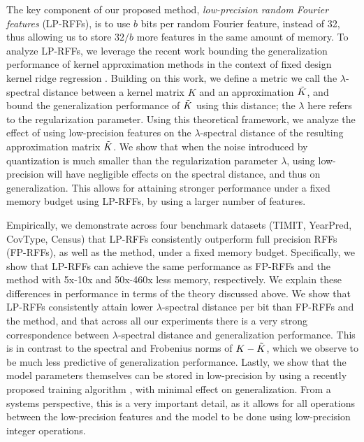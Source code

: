 
The key component of our proposed method, \textit{low-precision random Fourier features} (LP-RFFs), is to use $b$ bits per random Fourier feature, instead of 32, thus allowing us to store $32/b$ more features in the same amount of memory. To analyze LP-RFFs, we leverage the recent work bounding the generalization performance of kernel approximation methods in the context of fixed design kernel ridge regression \citep{avron17,musco17}. Building on this work, we define a metric we call the $\lambda$-spectral distance between a kernel matrix $K$ and an approximation $\tilde{K}$, and bound the generalization performance of $\tilde{K}$ using this distance; the $\lambda$ here refers to the regularization parameter. Using this theoretical framework, we analyze the effect of using low-precision features on the $\lambda$-spectral distance of the resulting approximation matrix $\tilde{K}$. We show that when the noise introduced by quantization is much smaller than the regularization parameter $\lambda$, using low-precision will have negligible effects on the spectral distance, and thus on generalization.  This allows for attaining stronger performance under a fixed memory budget using LP-RFFs, by using a larger number of features.

Empirically, we demonstrate across four benchmark datasets (TIMIT, YearPred, CovType, Census) that LP-RFFs consistently outperform full precision RFFs (FP-RFFs), as well as the \Nystrom method, under a fixed memory budget. Specifically, we show that LP-RFFs can achieve the same performance as FP-RFFs and the \Nystrom method with 5x-10x and 50x-460x less memory, respectively. We explain these differences in performance in terms of the theory discussed above. We show that LP-RFFs consistently attain lower $\lambda$-spectral distance per bit than FP-RFFs and the \Nystrom method, and that across all our experiments there is a very strong correspondence between $\lambda$-spectral distance and generalization performance. This is in contrast to the spectral and Frobenius norms of $K-\tilde{K}$, which we observe to be much less predictive of generalization performance. Lastly, we show that the model parameters themselves can be stored in low-precision by using a recently proposed training algorithm \citep{halp18}, with minimal effect on generalization. From a systems perspective, this is a very important detail, as it allows for all operations between the low-precision features and the model to be done using low-precision integer operations.


